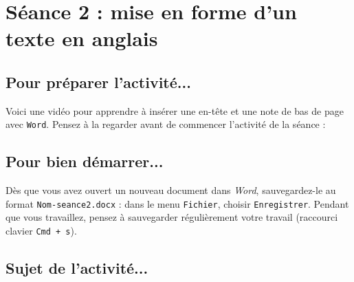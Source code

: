 




%
%
%
%


\newpage

\section{Séance 2 : mise en forme d'un texte en anglais}\label{ficheTexte5e2}

\subsection{Pour préparer l'activité...}

\vspace{10pt}

Voici une vidéo pour apprendre à insérer une en-tête et une note de bas de page avec \texttt{Word}. Pensez à la regarder avant de commencer l'activité de la séance :

\begin{center}
\end{center}

\vspace{12pt}

\subsection{Pour bien démarrer...}

\vspace{10pt}

Dès que vous avez ouvert un nouveau document dans \emph{Word}, sauvegardez-le au format \texttt{Nom-seance2.docx} : dans le menu \texttt{Fichier}, choisir \texttt{Enregistrer}. Pendant que vous travaillez, pensez à sauvegarder régulièrement votre travail (raccourci clavier \texttt{Cmd + s}).   


\subsection{Sujet de l'activité...}

\vspace{10pt}

